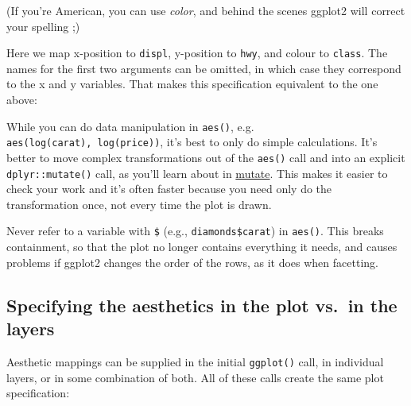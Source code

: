 \begin{Shaded}
\begin{Highlighting}[]
\NormalTok{(}   
\end{Highlighting}
\end{Shaded}

(If you're American, you can use \emph{color}, and behind the scenes
ggplot2 will correct your spelling ;)

Here we map x-position to \texttt{displ}, y-position to \texttt{hwy},
and colour to \texttt{class}. The names for the first two arguments can
be omitted, in which case they correspond to the x and y variables. That
makes this specification equivalent to the one above:

\begin{Shaded}
\begin{Highlighting}[]
 
\end{Highlighting}
\end{Shaded}

While you can do data manipulation in \texttt{aes()}, e.g.
\texttt{aes(log(carat),\ log(price))}, it's best to only do simple
calculations. It's better to move complex transformations out of the
\texttt{aes()} call and into an explicit \texttt{dplyr::mutate()} call,
as you'll learn about in \protect\hyperlink{mutate}{mutate}. This makes
it easier to check your work and it's often faster because you need only
do the transformation once, not every time the plot is drawn.

Never refer to a variable with \texttt{\$} (e.g.,
\texttt{diamonds\$carat}) in \texttt{aes()}. This breaks containment, so
that the plot no longer contains everything it needs, and causes
problems if ggplot2 changes the order of the rows, as it does when
facetting. \indexc{\$}

\subsection{Specifying the aesthetics in the plot vs.~in the
layers}\label{sub:plots-and-layers}

Aesthetic mappings can be supplied in the initial \texttt{ggplot()}
call, in individual layers, or in some combination of both. All of these
calls create the same plot specification:

